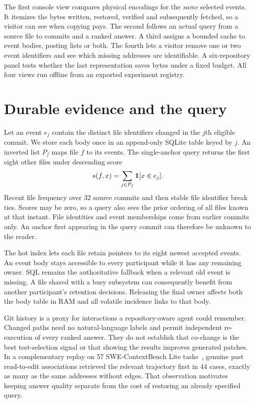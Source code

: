 \documentclass[conference]{IEEEtran}
\begin{document}
The first console view compares physical encodings for the \emph{same} selected events. It itemizes the bytes written, restored, verified and subsequently fetched, so a visitor can see when copying pays. The second follows an actual query from a source file to commits and a ranked answer. A third assigns a bounded cache to event bodies, posting lists or both. The fourth lets a visitor remove one or two event identifiers and see which missing addresses are identifiable. A six-repository panel tests whether the last representation saves bytes under a fixed budget. All four views run offline from an exported experiment registry.

\section{Durable evidence and the query}
Let an event $e_j$ contain the distinct file identifiers changed in the $j$th eligible commit. We store each body once in an append-only SQLite table keyed by $j$. An inverted list $P_f$ maps file $f$ to its events. The single-anchor query returns the first eight other files under descending score
\begin{equation}
s(f,x)=\sum_{j\in P_f} {\bf 1}[x\in e_j].
\end{equation}
Recent file frequency over 32 source commits and then stable file identifier break ties. Scores may be zero, so a query also sees the prior ordering of all files known at that instant. File identities and event memberships come from earlier commits only. An anchor first appearing in the query commit can therefore be unknown to the reader.

The hot index lets each file retain pointers to its eight newest accepted events. An event body stays accessible to every participant while it has any remaining owner. SQL remains the authoritative fallback when a relevant old event is missing. A file shared with a busy subsystem can consequently benefit from another participant's retention decisions. Releasing the final owner affects both the body table in RAM and all volatile incidence links to that body.

Git history is a proxy for interactions a repository-aware agent could remember. Changed paths need no natural-language labels and permit independent re-execution of every ranked answer. They do not establish that co-change is the best test-selection signal or that showing the results improves generated patches. In a complementary replay on 57 SWE-ContextBench Lite tasks~\cite{swectx}, genuine past read-to-edit associations retrieved the relevant trajectory first in 44 cases, exactly as many as the same addresses without edges. That observation motivates keeping answer quality separate from the cost of restoring an already specified query.
\end{document}
